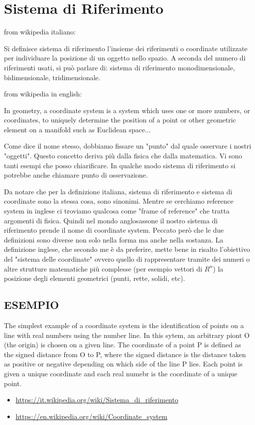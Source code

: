 \section{Sistema di Riferimento}
\begin{definizione}
from wikipedia italiano:

Si definisce sistema di riferimento l'insieme dei riferimenti o coordinate utilizzate per individuare la posizione di un oggetto
nello spazio. A seconda del numero di riferimenti usati, si può parlare di: sistema di riferimento monodimensionale, bidimensionale, tridimensionale.
\end{definizione}

\begin{definizione}
from wikipedia in english:

In geometry, a coordinate system is a system which uses one or more numbers, or coordinates, to uniquely determine the position of
a point or other geometric element on a manifold such as Euclidean space...
\end{definizione}

\begin{osservazione}
Come dice il nome stesso, dobbiamo fissare un "punto" dal quale osservare i nostri "oggetti". Questo concetto deriva più dalla fisica
che dalla matematica. Vi sono tanti esempi che posso chiarificare. In qualche modo sistema di riferimento si potrebbe anche chiamare
punto di osservazione.

Da notare che per la definizione italiana, sistema di riferimento e sistema di coordinate sono la stessa cosa, sono sinonimi. Mentre
se cerchiamo reference system in inglese ci troviamo qualcosa come "frame of reference" che tratta argomenti di fisica. Quindi nel mondo
anglosassone il nostro sistema di riferimento prende il nome di coordinate system. Peccato però che le due definizioni sono diverse
non solo nella forma ma anche nella sostanza. La definizione inglese, che secondo me è da preferire, mette bene in risalto l'obiettivo
del "sistema delle coordinate" ovvero quello di rappresentare tramite dei numeri o altre strutture matematiche più complesse (per esempio vettori di $R^n$) la 
posizione degli elementi geometrici (punti, rette, solidi, etc).
\end{osservazione}

\subsection{ESEMPIO}
The simplest example of a coordinate system is the identification of points on a line with real numbers using the number line.
In this sytem, an arbitrary piont O (the origin) is chosen on a given line. The coordinate of a point P is defined as the signed
distance from O to P, where the signed distance is the distance taken as positive or negative depending on which side of the
line P lies. Each point is given a unique coordinate and each real numebr is the coordinate of a unique point.

\begin{osservazione}

\begin{itemize}
 \item \url{https://it.wikipedia.org/wiki/Sistema_di_riferimento}
 \item \url{https://en.wikipedia.org/wiki/Coordinate_system}
\end{itemize}
\end{osservazione}


